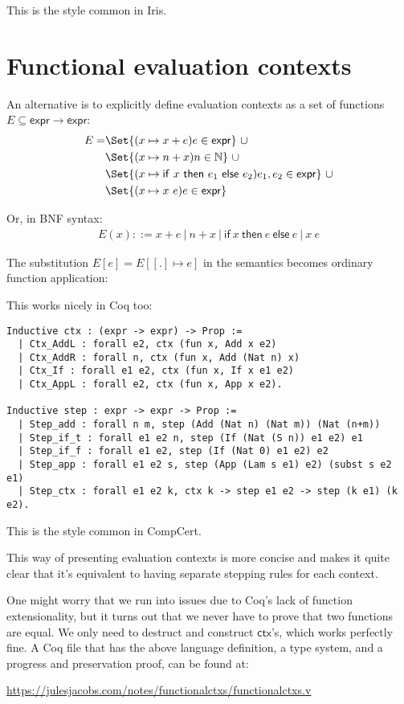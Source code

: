 \documentclass[a4paper, 11pt]{article}
\providecommand\given{} %
\newcommand{\mif}{\mathsf{if}\ }
\newcommand{\mthen}{\ \mathsf{then}\ }
\newcommand{\melse}{\ \mathsf{else}\ }
\begin{document}
This is the style common in Iris.

\section{Functional evaluation contexts}

An alternative is to explicitly define evaluation contexts as a set of functions $E \subseteq \mathsf{expr} \to \mathsf{expr}$:
\begin{align*}
  E = &\Set{(x \mapsto x + e) \given e \in \mathsf{expr} }\ \cup \\
  &\Set{(x \mapsto n + x) \given n \in \mathbb{N} }\ \cup \\
  &\Set{(x \mapsto \mif x \mthen e_1 \melse e_2) \given e_1,e_2 \in \mathsf{expr} }\ \cup \\
  &\Set{(x \mapsto x\ e) \given e \in \mathsf{expr} }
\end{align*}

Or, in BNF syntax:
\begin{align*}
  E(x) ::= x + e\ |\ n + x\ |\ \mif x \mthen e \melse e\ |\ x\ e
\end{align*}

The substitution $E[e] = E[[.] \mapsto e]$ in the semantics becomes ordinary function application:
\begin{mathpar}
\end{mathpar}

This works nicely in Coq too:
\begin{lstlisting}
Inductive ctx : (expr -> expr) -> Prop :=
  | Ctx_AddL : forall e2, ctx (fun x, Add x e2)
  | Ctx_AddR : forall n, ctx (fun x, Add (Nat n) x)
  | Ctx_If : forall e1 e2, ctx (fun x, If x e1 e2)
  | Ctx_AppL : forall e2, ctx (fun x, App x e2).

Inductive step : expr -> expr -> Prop :=
  | Step_add : forall n m, step (Add (Nat n) (Nat m)) (Nat (n+m))
  | Step_if_t : forall e1 e2 n, step (If (Nat (S n)) e1 e2) e1
  | Step_if_f : forall e1 e2, step (If (Nat 0) e1 e2) e2
  | Step_app : forall e1 e2 s, step (App (Lam s e1) e2) (subst s e2 e1)
  | Step_ctx : forall e1 e2 k, ctx k -> step e1 e2 -> step (k e1) (k e2).
\end{lstlisting}

This is the style common in CompCert.

This way of presenting evaluation contexts is more concise and makes it quite clear that it's equivalent to having separate stepping rules for each context.

One might worry that we run into issues due to Coq's lack of function extensionality, but it turns out that we never have to prove that two functions are equal. We only need to destruct and construct $\mathsf{ctx}$'s, which works perfectly fine. A Coq file that has the above language definition, a type system, and a progress and preservation proof, can be found at:

\begin{center}
  \url{https://julesjacobs.com/notes/functionalctxs/functionalctxs.v}
\end{center}
\end{document}
